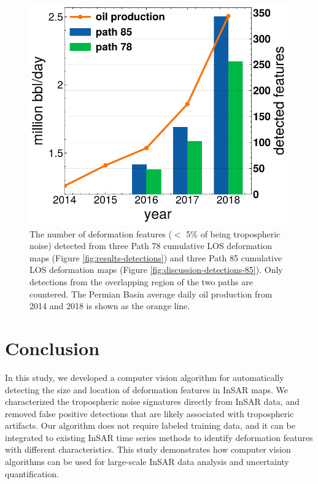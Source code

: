 \begin{figure}[hbt!]
	\centering 
	\includegraphics[width=0.98\linewidth]{paper2/figures/figure_discussion_oil_vs_blob_count.pdf}
	\caption[Number of detected deformation figures and yearly oil production]{
		The number of deformation features ($<$ 5\% of being tropospheric noise) detected from three Path 78 cumulative LOS deformation maps (Figure \ref{fig:results-detections}) and three Path 85 cumulative LOS deformation maps (Figure \ref{fig:discussion-detections-85}). Only detections from the overlapping region of the two paths are countered. The Permian Basin average daily oil production from 2014 and 2018 is shown as the orange line.
	}
	\label{fig:discussion-oil-blob-count}
\end{figure}



\section{Conclusion}


In this study, we developed a computer vision algorithm for automatically detecting the size and location of deformation features in InSAR maps. We characterized the tropospheric noise signatures directly from InSAR data, and removed false positive detections that are likely associated with  tropospheric artifacts. Our algorithm does not require labeled training data, and it can be integrated to existing InSAR time series methods to identify deformation features with different characteristics. This study demonstrates how computer vision algorithms can be used for large-scale InSAR data analysis and uncertainty quantification.


	
